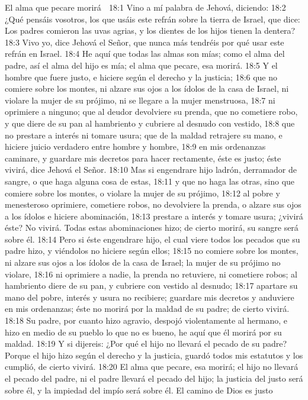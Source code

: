 El alma que pecare morirá  

18:1 Vino a mí palabra de Jehová, diciendo:  
18:2 ¿Qué pensáis vosotros, los que usáis este refrán sobre la tierra de Israel, que dice: Los padres comieron las uvas agrias, y los dientes de los hijos tienen la dentera?  
18:3 Vivo yo, dice Jehová el Señor, que nunca más tendréis por qué usar este refrán en Israel.  
18:4 He aquí que todas las almas son mías; como el alma del padre, así el alma del hijo es mía; el alma que pecare, esa morirá.  
18:5 Y el hombre que fuere justo, e hiciere según el derecho y la justicia;  
18:6 que no comiere sobre los montes, ni alzare sus ojos a los ídolos de la casa de Israel, ni violare la mujer de su prójimo, ni se llegare a la mujer menstruosa,  
18:7 ni oprimiere a ninguno; que al deudor devolviere su prenda, que no cometiere robo, y que diere de su pan al hambriento y cubriere al desnudo con vestido,  
18:8 que no prestare a interés ni tomare usura; que de la maldad retrajere su mano, e hiciere juicio verdadero entre hombre y hombre,  
18:9 en mis ordenanzas caminare, y guardare mis decretos para hacer rectamente, éste es justo; éste vivirá,  dice Jehová el Señor.  
18:10 Mas si engendrare hijo ladrón, derramador de sangre, o que haga alguna cosa de estas,  
18:11 y que no haga las otras, sino que comiere sobre los montes, o violare la mujer de su prójimo,  
18:12 al pobre y menesteroso oprimiere, cometiere robos, no devolviere la prenda, o alzare sus ojos a los ídolos e hiciere abominación,  
18:13 prestare a interés y tomare usura; ¿vivirá éste? No vivirá. Todas estas abominaciones hizo; de cierto morirá, su sangre será sobre él.  
18:14 Pero si éste engendrare hijo, el cual viere todos los pecados que su padre hizo, y viéndolos no hiciere según ellos;  
18:15 no comiere sobre los montes, ni alzare sus ojos a los ídolos de la casa de Israel; la mujer de su prójimo no violare,  
18:16 ni oprimiere a nadie, la prenda no retuviere, ni cometiere robos; al hambriento diere de su pan, y cubriere con vestido al desnudo;  
18:17 apartare su mano del pobre, interés y usura no recibiere; guardare mis decretos y anduviere en mis ordenanzas; éste no morirá por la maldad de su padre; de cierto vivirá.  
18:18 Su padre, por cuanto hizo agravio, despojó violentamente al hermano, e hizo en medio de su pueblo lo que no es bueno, he aquí que él morirá por su maldad.  
18:19 Y si dijereis: ¿Por qué el hijo no llevará el pecado de su padre? Porque el hijo hizo según el derecho y la justicia, guardó todos mis estatutos y los cumplió, de cierto vivirá.  
18:20 El alma que pecare, esa morirá; el hijo no llevará el pecado del padre, ni el padre llevará el pecado del hijo; la justicia del justo será sobre él, y la impiedad del impío será sobre él.  
El camino de Dios es justo  
 
